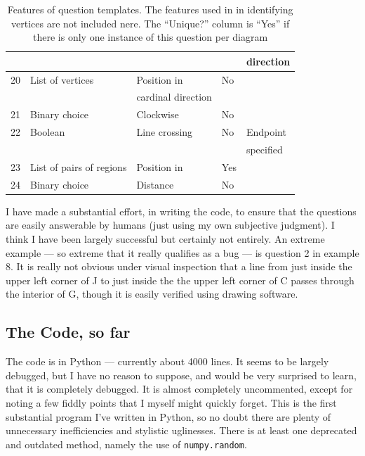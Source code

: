 \documentclass{article}    %
\begin{document}
\begin{table}
\begin{center}
\begin{tabular}{|l|l|l|l|l|}
   &                 &               &     & direction \\ \hline
20 & List of vertices & Position in  & No &            \\
   &                 & cardinal direction & & \\ \hline
21 & Binary choice  & Clockwise      & No & \\ \hline
22 & Boolean        & Line crossing  & No   & Endpoint \\
   &                 &               &     & specified \\ \hline
23 & List of pairs of regions & Position in    & Yes & \\ \hline
24 & Binary choice   & Distance & No & \\ \hline
\end{tabular}
\end{center}
\caption{Features of question templates. The features used in
in identifying vertices are not included nere. The ``Unique?'' column
is ``Yes'' if there is only one instance of this question per
diagram} 
\label{tabQuestions}
\end{table}

I have made a substantial effort, in writing the code, to ensure that
the questions are easily answerable by humans (just using my own subjective
judgment). I think I have been largely successful but certainly not entirely.
An extreme example --- so extreme that it really qualifies as a bug ---
is question 2 in example 8. It is really not obvious under visual inspection
that a line from just inside the upper left corner of J to just inside the
the upper left corner of C passes through the interior of G, though it is easily
verified using drawing software. 

\subsection{The Code, so far}
\label{secCode}
The code is in Python --- currently about 4000 lines. It seems to be largely 
debugged, but I have no reason to suppose, and would be very surprised to learn,
that it is completely debugged. It is almost completely uncommented, except
for noting a few fiddly points that I myself might quickly forget. This is the
first substantial program I've written in Python, so no doubt there are
plenty of unnecessary inefficiencies and stylistic uglinesses. There is at
least one deprecated and outdated method, namely the use of {\tt numpy.random}.
\end{document}
